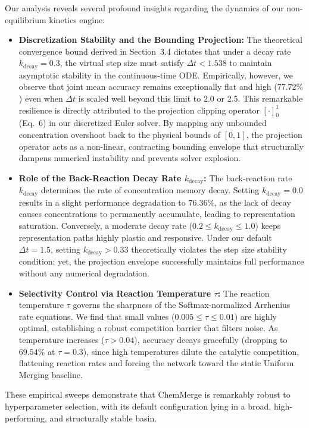 Our analysis reveals several profound insights regarding the dynamics of our non-equilibrium kinetics engine:
\begin{itemize}
    \item \textbf{Discretization Stability and the Bounding Projection:} The theoretical convergence bound derived in Section~3.4 dictates that under a decay rate $k_{\text{decay}} = 0.3$, the virtual step size must satisfy $\Delta t < 1.538$ to maintain asymptotic stability in the continuous-time ODE. Empirically, however, we observe that joint mean accuracy remains exceptionally flat and high ($77.72\%$) even when $\Delta t$ is scaled well beyond this limit to $2.0$ or $2.5$. This remarkable resilience is directly attributed to the projection clipping operator $[\cdot]_0^1$ (Eq.~6) in our discretized Euler solver. By mapping any unbounded concentration overshoot back to the physical bounds of $[0, 1]$, the projection operator acts as a non-linear, contracting bounding envelope that structurally dampens numerical instability and prevents solver explosion.
    \item \textbf{Role of the Back-Reaction Decay Rate $k_{\text{decay}}$:} The back-reaction rate $k_{\text{decay}}$ determines the rate of concentration memory decay. Setting $k_{\text{decay}} = 0.0$ results in a slight performance degradation to $76.36\%$, as the lack of decay causes concentrations to permanently accumulate, leading to representation saturation. Conversely, a moderate decay rate ($0.2 \le k_{\text{decay}} \le 1.0$) keeps representation paths highly plastic and responsive. Under our default $\Delta t = 1.5$, setting $k_{\text{decay}} > 0.33$ theoretically violates the step size stability condition; yet, the projection envelope successfully maintains full performance without any numerical degradation.
    \item \textbf{Selectivity Control via Reaction Temperature $\tau$:} The reaction temperature $\tau$ governs the sharpness of the Softmax-normalized Arrhenius rate equations. We find that small values ($0.005 \le \tau \le 0.01$) are highly optimal, establishing a robust competition barrier that filters noise. As temperature increases ($\tau > 0.04$), accuracy decays gracefully (dropping to $69.54\%$ at $\tau = 0.3$), since high temperatures dilute the catalytic competition, flattening reaction rates and forcing the network toward the static Uniform Merging baseline.
\end{itemize}
These empirical sweeps demonstrate that ChemMerge is remarkably robust to hyperparameter selection, with its default configuration lying in a broad, high-performing, and structurally stable basin. 


